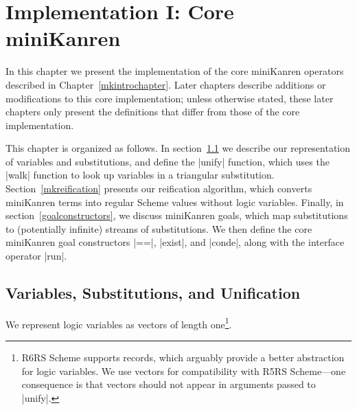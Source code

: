 \chapter{Implementation I:  Core miniKanren}\label{mkimplchapter}

In this chapter we present the implementation of the core miniKanren
operators described in Chapter~\ref{mkintrochapter}.  Later chapters
describe additions or modifications to this core implementation; unless
otherwise stated, these later chapters only present the definitions
that differ from those of the core implementation.

This chapter is organized as follows.  In section~\ref{mkunif} we
describe our representation of variables and substitutions, and define
the \scheme|unify| function, which uses the \scheme|walk| function to
look up variables in a triangular substitution.
Section~\ref{mkreification} presents our reification algorithm, which
converts miniKanren terms into regular Scheme values without logic
variables.  Finally, in section~\ref{goalconstructors}, we discuss
miniKanren goals, which map substitutions to (potentially infinite)
streams of substitutions.  We then define the core miniKanren goal
constructors \scheme|==|, \scheme|exist|, and \scheme|conde|, along
with the interface operator \scheme|run|.



\section{Variables, Substitutions, and Unification}\label{mkunif}

We represent logic variables as vectors of length one\footnote{R6RS
  Scheme supports records, which arguably provide a better abstraction
  for logic variables.  We use vectors for compatibility with R5RS
  Scheme---one consequence is that vectors should not appear in
  arguments passed to \scheme|unify|.}.


